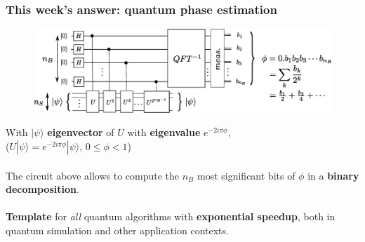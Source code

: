 \documentclass{beamer}
\begin{document}
\begin{frame}
\frametitle{This week's answer: quantum phase estimation}
\begin{center}
\begin{figure}
\includegraphics[width=\textwidth]{quantum_phase_estimation.eps}
\end{figure}
\end{center}

With $|\psi\rangle$ \textbf{eigenvector} of $U$ with \textbf{eigenvalue} $e^{-2i\pi\phi}$,\\
 ($U|\psi\rangle = e^{-2i\pi\phi}|\psi\rangle$, $0\leq\phi<1$)\\~\\
The circuit above allows to compute the $n_{B}$ most significant bits of $\phi$ in a \textbf{binary
decomposition}.\\~\\

\textbf{Template} for \emph{all} quantum algorithms with \textbf{exponential speedup}, both in quantum simulation
and other application contexts.\\
\end{frame}
\end{document}
